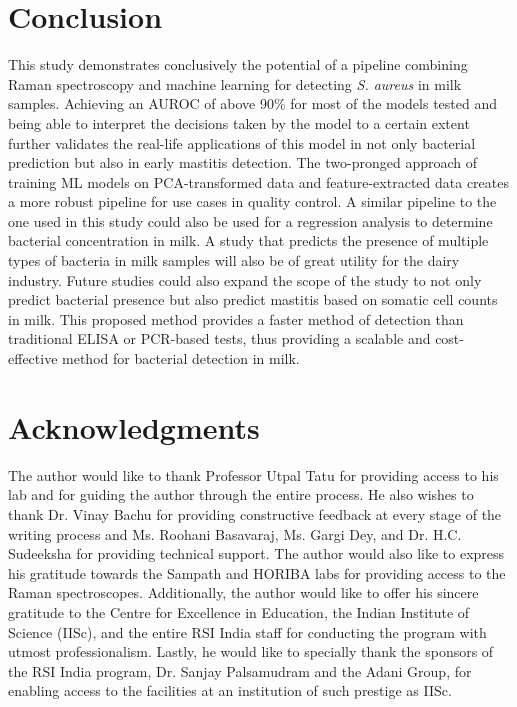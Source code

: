 \section{Conclusion} \label{sec:conclusion}

This study demonstrates conclusively the potential of a pipeline combining Raman spectroscopy and machine learning for detecting \textit{S. aureus} in milk samples. Achieving an AUROC of above 90\% for most of the models tested and being able to interpret the decisions taken by the model to a certain extent further validates the real-life applications of this model in not only bacterial prediction but also in early mastitis detection. The two-pronged approach of training ML models on PCA-transformed data and feature-extracted data creates a more robust pipeline for use cases in quality control. A similar pipeline to the one used in this study could also be used for a regression analysis to determine bacterial concentration in milk. A study that predicts the presence of multiple types of bacteria in milk samples will also be of great utility for the dairy industry. Future studies could also expand the scope of the study to not only predict bacterial presence but also predict mastitis based on somatic cell counts in milk. This proposed method provides a faster method of detection than traditional ELISA or PCR-based tests, thus providing a scalable and cost-effective method for bacterial detection in milk. 


\section{Acknowledgments} 

The author would like to thank Professor Utpal Tatu for providing access to his lab and for guiding the author through the entire process. He also wishes to thank Dr. Vinay Bachu for providing constructive feedback at every stage of the writing process and Ms. Roohani Basavaraj, Ms. Gargi Dey, and Dr. H.C. Sudeeksha for providing technical support. The author would also like to express his gratitude towards the Sampath and HORIBA labs for providing access to the Raman spectroscopes. Additionally, the author would like to offer his sincere gratitude to the Centre for Excellence in Education, the Indian Institute of Science (IISc), and the entire RSI India staff for conducting the program with utmost professionalism. Lastly, he would like to specially thank the sponsors of the RSI India program, Dr. Sanjay Palsamudram and the Adani Group, for enabling access to the facilities at an institution of such prestige as IISc. 






